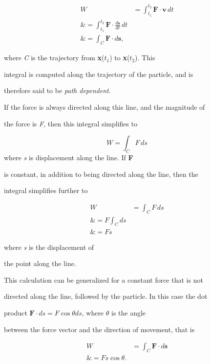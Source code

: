 \begin{align}
W &=  \int _{t _1}^{t _2}\mathbf{F} \cdot \mathbf{v}\,dt \\\&=  \int _{t _1}^{t _2}\mathbf{F} \cdot \tfrac{d\mathbf{s}}{dt}\,dt \\\&= \int _C \mathbf{F} \cdot d\mathbf{s},
\end{align}



where \textit{C} is the trajectory from \textbf{x}($t _1$) to \textbf{x}($t _2$). This

integral is computed along the trajectory of the particle, and is

therefore said to be \textit{path dependent}.



If the force is always directed along this line, and the magnitude of

the force is \textit{F}, then this integral simplifies to



$$W = \int _C F\,ds$$ where \textit{s} is displacement along the line. If \textbf{F}

is constant, in addition to being directed along the line, then the

integral simplifies further to



\begin{align}
W &= \int _C F\,ds \\\&= F\int _C ds \\\&= Fs
\end{align}



where \textit{s} is the displacement of

the point along the line.



This calculation can be generalized for a constant force that is not

directed along the line, followed by the particle. In this case the dot

product $ \mathbf{F} \cdot ds = F \cos \theta ds$, where $\theta$ is the angle

between the force vector and the direction of movement, that is



\begin{align}
W &= \int _C \mathbf{F} \cdot d\mathbf{s} \\\&= Fs\cos\theta.
\end{align}





